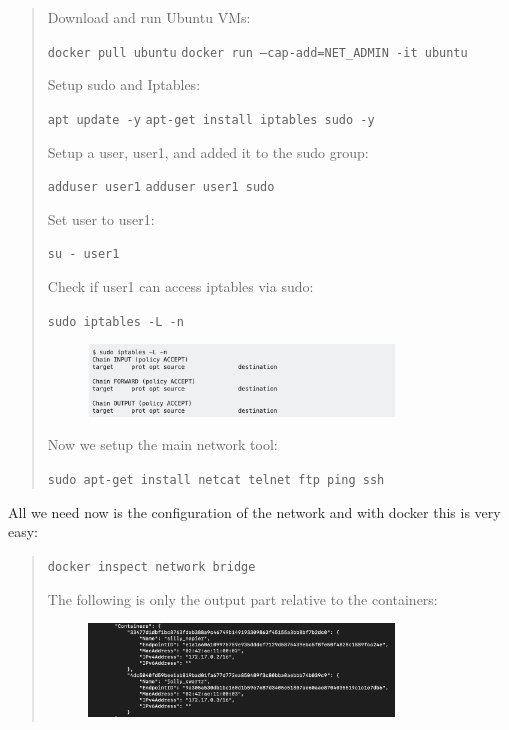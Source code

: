 \documentclass[11pt]{article}
\begin{document}
\begin{quote}
  Download and run Ubuntu VMs:

  \texttt{docker pull ubuntu}\newline
  \texttt{docker run --cap-add=NET\_ADMIN -it ubuntu}\newline

  Setup sudo and Iptables:

  \texttt{apt update -y}\newline
  \texttt{apt-get install iptables sudo -y}\newline

  Setup a user, user1, and added it to the sudo group:

  \texttt{adduser user1}\newline
  \texttt{adduser user1 sudo}\newline

  Set user to user1:

  \texttt{su - user1}\newline

  Check if user1 can access iptables via sudo:

  \texttt{sudo iptables -L -n}\newline
  \begin{figure}[!ht]
    \centering
    \includegraphics[width=0.8\textwidth]{pic1-hw8-1635747.png}
    \label{fig:conf}
  \end{figure}

  Now we setup the main network tool:

  \texttt{sudo apt-get install netcat telnet ftp ping ssh}
\end{quote}

All we need now is the configuration of the network and with docker this is very easy:
\begin{quote}
  \texttt{docker inspect network bridge}\newline

  The following is only the output part relative to the containers:
  \begin{figure}[!ht]
    \centering
    \includegraphics[width=0.8\textwidth]{pic2-hw8-1635747.png}
    \label{fig:conf}
  \end{figure}
\end{quote}
\end{document}
